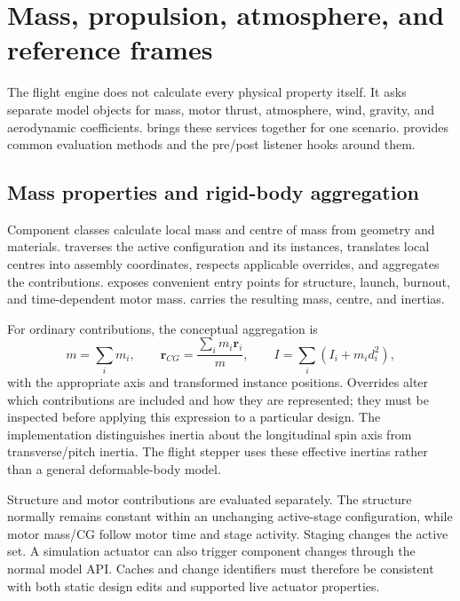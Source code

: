 \chapter{Mass, propulsion, atmosphere, and reference frames}\label{ch:models}
The flight engine does not calculate every physical property itself. It asks separate model objects for mass, motor thrust, atmosphere, wind, gravity, and aerodynamic coefficients.  brings these services together for one scenario.  provides common evaluation methods and the pre/post listener hooks around them.

\section{Mass properties and rigid-body aggregation}
Component classes calculate local mass and centre of mass from geometry and materials.  traverses the active configuration and its instances, translates local centres into assembly coordinates, respects applicable overrides, and aggregates the contributions.  exposes convenient entry points for structure, launch, burnout, and time-dependent motor mass.  carries the resulting mass, centre, and inertias.

For ordinary contributions, the conceptual aggregation is
\begin{equation}
 m=\sum_i m_i,\qquad \boldsymbol r_{CG}=\frac{\sum_i m_i\boldsymbol r_i}{m},
 \qquad I=\sum_i\left(I_i+m_i d_i^2\right),
\end{equation}
with the appropriate axis and transformed instance positions. Overrides alter which contributions are included and how they are represented; they must be inspected before applying this expression to a particular design. The implementation distinguishes inertia about the longitudinal spin axis from transverse/pitch inertia. The flight stepper uses these effective inertias rather than a general deformable-body model.

Structure and motor contributions are evaluated separately. The structure normally remains constant within an unchanging active-stage configuration, while motor mass/CG follow motor time and stage activity. Staging changes the active set. A simulation actuator can also trigger component changes through the normal model API. Caches and change identifiers must therefore be consistent with both static design edits and supported live actuator properties.

